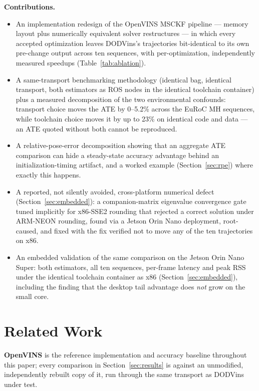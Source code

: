\documentclass[10pt,conference,letterpaper]{IEEEtran}
\begin{document}
\textbf{Contributions.}
\begin{itemize}
\item An implementation redesign of the OpenVINS MSCKF pipeline ---
  memory layout plus numerically equivalent solver restructures --- in which
  every accepted optimization leaves DODVins's trajectories bit-identical to
  its own pre-change output across ten sequences, with per-optimization,
  independently measured speedups (Table~\ref{tab:ablation}).
\item A same-transport benchmarking methodology (identical bag, identical
  transport, both estimators as ROS nodes in the identical toolchain
  container) plus a measured decomposition of the two environmental
  confounds: transport choice moves the ATE by 0--5.2\% across the EuRoC MH
  sequences, while toolchain choice moves it by up to 23\% on identical
  code and data --- an ATE quoted without both cannot be reproduced.
\item A relative-pose-error decomposition showing that an aggregate ATE
  comparison can hide a steady-state accuracy advantage behind an
  initialization-timing artifact, and a worked example (Section~\ref{sec:rpe})
  where exactly this happens.
\item A reported, not silently avoided, cross-platform numerical defect
  (Section~\ref{sec:embedded}): a companion-matrix eigenvalue convergence
  gate tuned implicitly for x86-SSE2 rounding that rejected a correct solution
  under ARM-NEON rounding, found via a Jetson Orin Nano deployment,
  root-caused, and fixed with the fix verified not to move any of
  the ten trajectories on x86.
\item An embedded validation of the same comparison on the Jetson Orin Nano
  Super: both estimators, all ten sequences, per-frame latency and peak RSS
  under the identical toolchain container as x86
  (Section~\ref{sec:embedded}), including the finding that the desktop tail
  advantage does \emph{not} grow on the small core.
\end{itemize}

\section{Related Work}

\textbf{OpenVINS} \cite{geneva2020openvins} is the reference implementation
and accuracy baseline throughout this paper; every comparison in
Section~\ref{sec:results} is against an unmodified, independently rebuilt
copy of it, run through the same transport as DODVins under
test.
\end{document}

